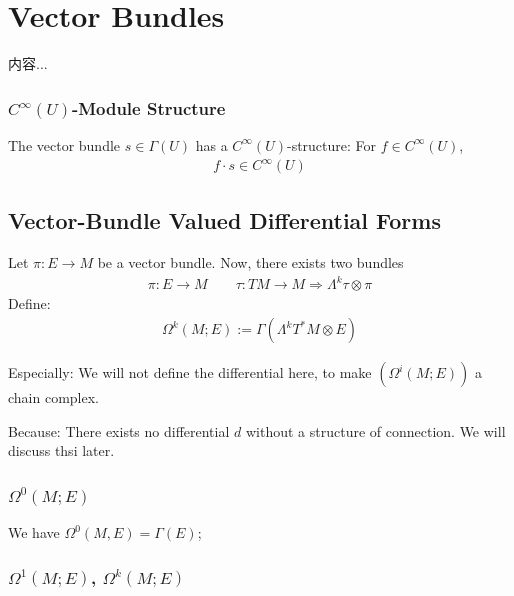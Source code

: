 \documentclass[Total.tex]{subfiles}
\begin{document}
		\section{Vector Bundles}
			
			\begin{Def}
				内容...
			\end{Def}
			\subsubsection{$C^\infty(U)$-Module Structure}
				\begin{Def}
					The vector bundle $s\in \Gamma(U)$ has a $C^\infty(U)$-structure: For $f\in C^\infty(U)$,
					\begin{gather*}
						f\cdot s\in C^\infty(U)
					\end{gather*}
				\end{Def}
			\subsection{Vector-Bundle Valued Differential Forms}
				\begin{Def}
					Let $\pi:E\rightarrow M$ be a vector bundle. Now, there exists two bundles
					\begin{gather*}
						\pi:E\rightarrow M\qquad \tau:TM\rightarrow M\Rightarrow \Lambda^k \tau\otimes \pi
					\end{gather*}
					Define:
					\begin{gather*}
						\Omega^k(M;E):=\Gamma(\Lambda^k T^*M\otimes E)
					\end{gather*}
				\end{Def}
				
				Especially: We will not define the differential here, to make $(\Omega^i(M;E))$ a chain complex. 
				
				Because: There exists no differential $d$ without a structure of connection. We will discuss thsi later. 
				\subsubsection{$\Omega^0(M;E)$}
				
				We have $\Omega^0(M,E)=\Gamma(E)$;
				
				\subsubsection{$\Omega^1(M;E)$, $\Omega^k(M;E)$}
				
\end{document}
